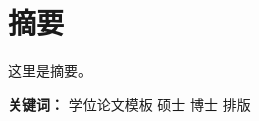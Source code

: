 \chapter{\texorpdfstring{摘\quad 要}{摘要}}



这里是摘要。


\vspace{1em}

{%
\noindent\textbf{%
关键词：}%
学位论文模板\quad
硕士\quad
博士\quad
排版
}











